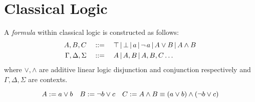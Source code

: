 \section{Classical Logic}

    \begin{definition*}[Formulae]
        A \textit{formula} within classical logic is constructed as follows:
        \begin{align*}
            A, B, C                \quad &::= \quad \top \,|\, \bot \,|\, a \,|\, \neg\, a \,|\, A \vee B \,|\, A \wedge B \\
            \Gamma, \Delta, \Sigma \quad &::= \quad A \,|\, A,B \,|\, A,B,C \ldots
        \end{align*}
        where $\vee, \wedge$ are additive linear logic disjunction and conjunction respectively and $\Gamma, \Delta, \Sigma$ are contexts.
    \end{definition*}

    \begin{example}
        \begin{equation*}
            A := a \vee b \quad B := \neg b \vee c \quad C := A \wedge B \equiv (a \vee b) \wedge (\neg b \vee c)
        \end{equation*}
    \end{example}


